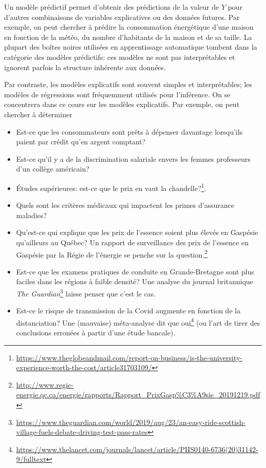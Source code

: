 \documentclass[
  11pt,
  letterpaper,
]{article}
\providecommand{\tightlist}{%
  \setlength{\itemsep}{0pt}\setlength{\parskip}{0pt}}
\renewcommand{\href}[2]{#2\footnote{\url{#1}}}
\theoremstyle{definition}
\theoremstyle{definition}
\theoremstyle{definition}
\theoremstyle{definition}
\theoremstyle{remark}
\begin{document}
Un modèle prédictif permet d'obtenir des prédictions de la valeur de \(Y\) pour d'autres combinaisons de variables explicatives ou des données futures. Par exemple, on peut chercher à prédire la consommation énergétique d'une maison en fonction de la météo, du nombre d'habitants de la maison et de sa taille. La plupart des boîtes noires utilisées en apprentissage automatique tombent dans la catégorie des modèles prédictifs: ces modèles ne sont pas interprétables et ignorent parfois la structure inhérente aux données.

Par contraste, les modèles explicatifs sont souvent simples et interprétables; les modèles de régressions sont fréquemment utilisés pour l'inférence. On se concentrera dans ce cours sur les modèles explicatifs. Par exemple, on peut chercher à déterminer

\begin{itemize}
\tightlist
\item
  Est-ce que les consommateurs sont prêts à dépenser davantage lorsqu'ils paient par crédit qu'en argent comptant?
\item
  Est-ce qu'il y a de la discrimination salariale envers les femmes professeurs d'un collège américain?
\item
  Études supérieures: \href{https://www.theglobeandmail.com/report-on-business/is-the-university-experience-worth-the-cost/article31703109/}{est-ce que le prix en vaut la chandelle?}.
\item
  Quels sont les critères médicaux qui impactent les primes d'assurance maladies?
\item
  Qu'est-ce qui explique que les prix de l'essence soient plus élevés en Gaspésie qu'ailleurs au Québec? \href{http://www.regie-energie.qc.ca/energie/rapports/Rapport_PrixGasp\%C3\%A9sie_20191219.pdf}{Un rapport de surveillance des prix de l'essence en Gaspésie par la Régie de l'énergie se penche sur la question.}
\item
  Est-ce que les examens pratiques de conduite en Grande-Bretagne sont plus faciles dans les régions à faible densité? \href{https://www.theguardian.com/world/2019/aug/23/an-easy-ride-scottish-village-fuels-debate-driving-test-pass-rates}{Une analyse du journal britannique \emph{The Guardian}} laisse penser que c'est le cas.
\item
  Est-ce le risque de transmission de la Covid augmente en fonction de la distanciation? \href{https://www.thelancet.com/journals/lancet/article/PIIS0140-6736(20)31142-9/fulltext}{Une (mauvaise) méta-analyse dit que oui} (ou l'art de tirer des conclusions erronées à partir d'une étude bancale).
\end{itemize}
\end{document}
